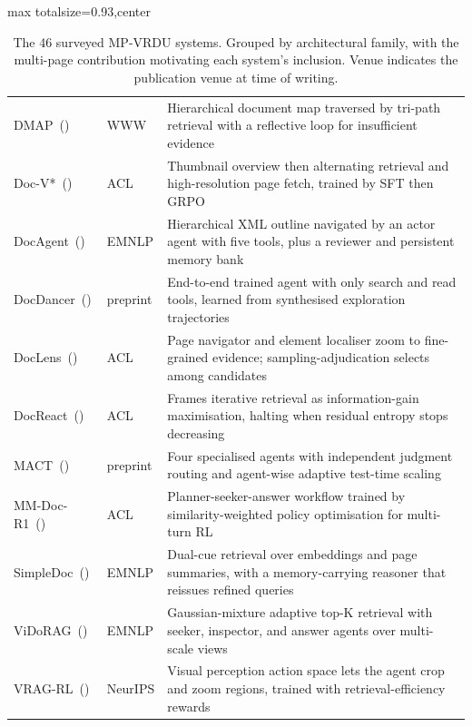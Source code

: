 \begin{table}[p]
\begin{adjustbox}{max totalsize={\textwidth}{0.93\textheight},center}
\begin{tabular}{@{}l l >{\raggedright\arraybackslash}p{}@{}}
\rowcolor{sectionbg}
\multicolumn{3}{l}{\textbf{Adaptive-Trajectory Pipelines}} \\
\midrule
  {DMAP}~(\citeyear{fu2026dmap}) & WWW & Hierarchical document map traversed by tri-path retrieval with a reflective loop for insufficient evidence \\
  {Doc-V*}~(\citeyear{zheng2026doc}) & ACL & Thumbnail overview then alternating retrieval and high-resolution page fetch, trained by SFT then GRPO \\
  {DocAgent}~(\citeyear{sun2025docagent}) & EMNLP & Hierarchical XML outline navigated by an actor agent with five tools, plus a reviewer and persistent memory bank \\
  {DocDancer}~(\citeyear{zhang2026docdancer}) & preprint & End-to-end trained agent with only search and read tools, learned from synthesised exploration trajectories \\
  {DocLens}~(\citeyear{zhu2026doclens}) & ACL & Page navigator and element localiser zoom to fine-grained evidence; sampling-adjudication selects among candidates \\
  {DocReact}~(\citeyear{wu2025doc}) & ACL & Frames iterative retrieval as information-gain maximisation, halting when residual entropy stops decreasing \\
  {MACT}~(\citeyear{yu2025visual}) & preprint & Four specialised agents with independent judgment routing and agent-wise adaptive test-time scaling \\
  {MM-Doc-R1}~(\citeyear{lin2026mm}) & ACL & Planner-seeker-answer workflow trained by similarity-weighted policy optimisation for multi-turn RL \\
  {SimpleDoc}~(\citeyear{jain2025simpledoc}) & EMNLP & Dual-cue retrieval over embeddings and page summaries, with a memory-carrying reasoner that reissues refined queries \\
  {ViDoRAG}~(\citeyear{wang2025vidorag}) & EMNLP & Gaussian-mixture adaptive top-K retrieval with seeker, inspector, and answer agents over multi-scale views \\
  {VRAG-RL}~(\citeyear{wang2025vrag}) & NeurIPS & Visual perception action space lets the agent crop and zoom regions, trained with retrieval-efficiency rewards \\

\bottomrule
\end{tabular}
\end{adjustbox}
\caption{The 46 surveyed MP-VRDU systems. Grouped by architectural family, with the multi-page contribution motivating each system's inclusion. Venue indicates the publication venue at time of writing.}
\label{tab:survey_corpus}
\end{table}